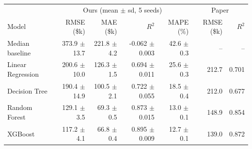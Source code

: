 \begin{tabular}{lrrrr|rr}
\hline
 & \multicolumn{4}{c|}{Ours (mean $\pm$ sd, 5 seeds)} & \multicolumn{2}{c}{Paper} \\
Model & RMSE (\$k) & MAE (\$k) & $R^2$ & MAPE (\%) & RMSE (\$k) & $R^2$ \\
\hline
Median baseline & 373.9 $\pm$ 13.7 & 221.8 $\pm$ 4.2 & -0.062 $\pm$ 0.003 & 42.6 $\pm$ 0.3 & -- & -- \\
Linear Regression & 200.6 $\pm$ 10.0 & 126.3 $\pm$ 1.5 & 0.694 $\pm$ 0.011 & 25.6 $\pm$ 0.3 & 212.7 & 0.701 \\
Decision Tree & 190.4 $\pm$ 14.9 & 100.5 $\pm$ 2.1 & 0.722 $\pm$ 0.055 & 18.5 $\pm$ 0.4 & 212.0 & 0.677 \\
Random Forest & 129.1 $\pm$ 3.5 & 69.3 $\pm$ 0.5 & 0.873 $\pm$ 0.015 & 13.0 $\pm$ 0.1 & 148.9 & 0.854 \\
XGBoost & 117.2 $\pm$ 4.1 & 66.8 $\pm$ 0.4 & 0.895 $\pm$ 0.009 & 12.7 $\pm$ 0.1 & 139.0 & 0.872 \\
\hline
\end{tabular}

